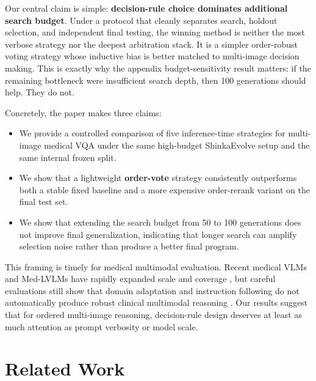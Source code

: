 \documentclass[11pt]{article}
\begin{document}
Our central claim is simple: \textbf{decision-rule choice dominates additional search budget}. Under a protocol that cleanly separates search, holdout selection, and independent final testing, the winning method is neither the most verbose strategy nor the deepest arbitration stack. It is a simpler order-robust voting strategy whose inductive bias is better matched to multi-image decision making. This is exactly why the appendix budget-sensitivity result matters: if the remaining bottleneck were insufficient search depth, then 100 generations should help. They do not.

Concretely, the paper makes three claims:
\begin{itemize}[leftmargin=1.5em]
    \item We provide a controlled comparison of five inference-time strategies for multi-image medical VQA under the same high-budget ShinkaEvolve setup and the same internal frozen split.
    \item We show that a lightweight \textbf{order-vote} strategy consistently outperforms both a stable fixed baseline and a more expensive order-rerank variant on the final test set.
    \item We show that extending the search budget from 50 to 100 generations does not improve final generalization, indicating that longer search can amplify selection noise rather than produce a better final program.
\end{itemize}

This framing is timely for medical multimodal evaluation. Recent medical VLMs and Med-LVLMs have rapidly expanded scale and coverage \citep{moor2023medflamingo,li2023llavamed,zhang2023biomedgpt,hu2024omnimedvqa,chen2024chexagent,lin2025healthgpt}, but careful evaluations still show that domain adaptation and instruction following do not automatically produce robust clinical multimodal reasoning \citep{jeong2024medicaladapt,agrawal2025evaluationillusion}. Our results suggest that for ordered multi-image reasoning, decision-rule design deserves at least as much attention as prompt verbosity or model scale.

\section{Related Work}
\end{document}
